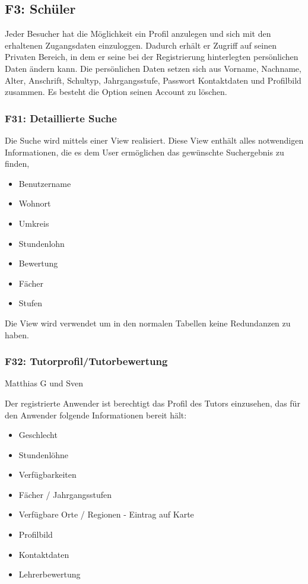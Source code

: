 \documentclass[10pt,a4paper]{scrartcl}
\begin{document}
\subsection{F3: Schüler}
Jeder Besucher hat die Möglichkeit ein Profil anzulegen und sich mit den erhaltenen Zugangsdaten einzuloggen.
Dadurch erhält er Zugriff auf seinen Privaten Bereich, in dem er seine bei der Registrierung hinterlegten persönlichen Daten ändern kann.
Die persönlichen Daten setzen sich aus Vorname, Nachname, Alter, Anschrift, Schultyp, Jahrgangsstufe, Passwort Kontaktdaten und Profilbild zusammen. 
Es besteht die Option seinen Account zu löschen.

\subsubsection*{F31: Detaillierte Suche}

Die Suche wird mittels einer View realisiert. Diese View enthält alles notwendigen Informationen, die es dem User ermöglichen das gewünschte Suchergebnis zu finden,
\begin{itemize}
 \item Benutzername
 \item Wohnort
 \item Umkreis
 \item Stundenlohn
 \item Bewertung
 \item Fächer
 \item Stufen
\end{itemize}

Die View wird verwendet um in den normalen Tabellen keine Redundanzen zu haben. 

\subsubsection*{F32: Tutorprofil/Tutorbewertung}

Matthias G und Sven

Der registrierte Anwender ist berechtigt das Profil des Tutors einzusehen, das für den Anwender folgende Informationen bereit hält:

\begin{itemize}
	\item Geschlecht
	\item Stundenlöhne 
	\item Verfügbarkeiten 
	\item Fächer / Jahrgangsstufen 
	\item Verfügbare Orte / Regionen - Eintrag auf Karte
	\item Profilbild
	\item Kontaktdaten
	\item Lehrerbewertung
\end{itemize}
	
\end{document}
